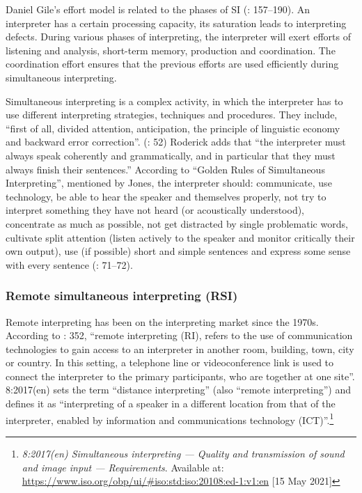 \documentclass[output=paper]{langscibook}
\begin{document}
Daniel Gile’s effort model is related to the phases of SI (\citealt{Gile2009}: 157–190). An interpreter has a certain processing capacity, its saturation leads to interpreting defects. During various phases of interpreting, the interpreter will exert efforts of listening and analysis, short-term memory, production and coordination. The coordination effort ensures that the previous efforts are used efficiently during simultaneous interpreting.

Simultaneous interpreting is a complex activity, in which the interpreter has to use different interpreting strategies, techniques and procedures. They include, “first of all, divided attention, anticipation, the principle of linguistic economy and backward error correction”. (\citealt{Čeňková2008}: 52) Roderick \citet[83]{Jones1998} adds that “the interpreter must always speak coherently and grammatically, and in particular that they must always finish their sentences.” According to “Golden Rules of Simultaneous Interpreting”, mentioned by Jones, the interpreter should: communicate, use technology, be able to hear the speaker and themselves properly, not try to interpret something they have not heard (or acoustically understood), concentrate as much as possible, not get distracted by single problematic words, cultivate split attention (listen actively to the speaker and monitor critically their own output), use (if possible) short and simple sentences and express some sense with every sentence (\citealt{Jones2002}: 71–72).

\subsubsection{Remote simultaneous interpreting (RSI)} %

Remote interpreting has been on the interpreting market since the 1970s. According to \citep[352]{Braun2015}: 352, “remote interpreting (RI), refers to the use of communication technologies to gain access to an interpreter in another room, building, town, city or country. In this setting, a telephone line or videoconference link is used to connect the interpreter to the primary participants, who are together at one site”. \citealt{ISO2010}8:2017(en) sets the term “distance interpreting” (also “remote interpreting”) and defines it as “interpreting of a speaker in a different location from that of the interpreter, enabled by information and communications technology (ICT)”.\footnote{{\textit{\citealt{ISO2010}8:2017(en) Simultaneous interpreting — Quality and transmission of sound and image input — Requirements}}{. Available at:} \url{https://www.iso.org/obp/ui/\#iso:std:iso:20108:ed-1:v1:en} {[15  {May 2021}]}}
\end{document}
